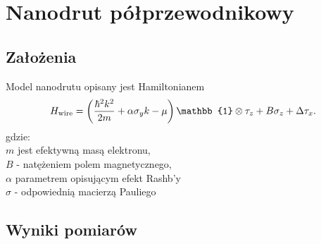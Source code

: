 \documentclass[a4paper, 12pt]{article}
\begin{document}
\section{Nanodrut półprzewodnikowy}
\subsection{Założenia}
Model nanodrutu opisany jest Hamiltonianem
\begin{equation}
    H_{\text{wire}} = \left(\frac{\hbar^2 k^2}{2m} + \alpha\sigma_y k - \mu\right)\mathbb{1} \tens \tau_z + B\sigma_z + \Delta\tau_x.
\end{equation}
gdzie: \\ $m$ jest efektywną masą elektronu, \\$B$ - natężeniem polem magnetycznego, \\$\alpha$ parametrem opisującym efekt Rashb'y \\ $\sigma$ - odpowiednią macierzą Pauliego



\subsection{Wyniki pomiarów}
\end{document}
